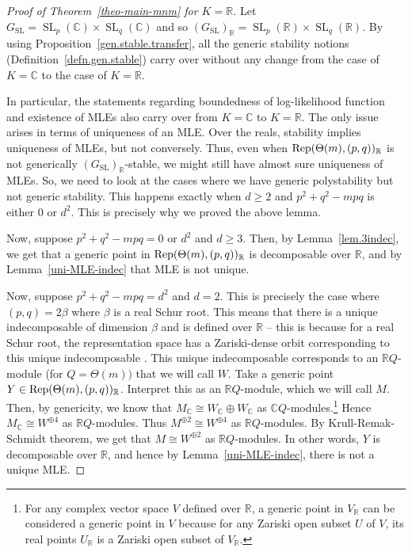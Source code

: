 \documentclass[11pt]{amsart}
\theoremstyle{definition}
\newcommand{\R}{{\mathbb R}}
\newcommand{\Rep}{{\rm Rep}}
\newcommand{\C}{{\mathbb C}}
\newcommand{\Mat}{\operatorname{Mat}}
\newcommand{\SL}{\operatorname{SL}}
\begin{document}
\begin{proof} [Proof of Theorem~\ref{theo-main-mnm} for $K = \R$]
Let $G_{\SL} = \SL_p(\C) \times \SL_q(\C)$ and so $(G_{\SL})_\R = \SL_p(\R) \times \SL_q(\R)$. By using Proposition~\ref{gen.stable.transfer}, all the generic stability notions (Definition~\ref{defn.gen.stable}) carry over without any change from the case of $K = \C$ to the case of $K = \R$. %

In particular, the statements regarding boundedness of log-likelihood function and existence of MLEs also carry over from $K = \C$ to $K = \R$. The only issue arises in terms of uniqueness of an  MLE. Over the reals, stability implies uniqueness of MLEs, but not conversely. Thus, even when $\Rep(\Theta(m),(p,q))_\R$ is not generically $(G_{\SL})_\R$-stable, we might still have almost sure uniqueness of MLEs. So, we need to look at the cases where we have generic polystability but not generic stability. This happens exactly when $d \geq 2$ and $p^2 + q^2 - mpq$ is either $0$ or $d^2$. This is precisely why we proved the above lemma.

Now, suppose $p^2 + q^2 - mpq = 0$ or $d^2$ and $d \geq 3$. Then, by Lemma~\ref{lem.3indec}, we get that a generic point in $\Rep(\Theta(m),(p,q))_\R$ is decomposable over $\R$, and by Lemma~\ref{uni-MLE-indec} that MLE is not unique.

Now, suppose $p^2 + q^2 - mpq = d^2$ and $d = 2$. This is precisely the case where $(p,q) = 2 \beta$ where $\beta$ is a real Schur root. This means that there is a unique indecomposable of dimension $\beta$ and is defined over $\R$ -- this is because for a real Schur root, the representation space has a Zariski-dense orbit corresponding to this unique indecomposable \cite[Lemma~11.1.3]{DW-book}. This unique indecomposable corresponds to an $\R Q$-module (for $Q = \Theta(m))$ that we will call $W$. Take a generic point $Y \in \Rep(\Theta(m),(p,q))_\R$. Interpret this as an $\R Q$-module, which we will call $M$. Then, by genericity, we know that $M_\C \cong W_\C \oplus W_\C$ as $\C Q$-modules.\footnote{For any complex vector space $V$ defined over $\R$, a generic point in $V_\R$ can be considered a generic point in $V$ because for any Zariski open subset $U$ of $V$, its real points $U_\R$ is a Zariski open subset of $V_\R$.} Hence $M_\C \cong W^{\oplus 4}$ as $\R Q$-modules. Thus $M^{\oplus 2} \cong W^{\oplus 4}$ as $\R Q$-modules. By Krull-Remak-Schmidt theorem, we get that $M \cong W^{\oplus 2}$ as $\R Q$-modules. In other words, $Y$ is decomposable over $\R$, and hence by Lemma~\ref{uni-MLE-indec}, there is not a unique MLE.



\end{proof}
\end{document}
